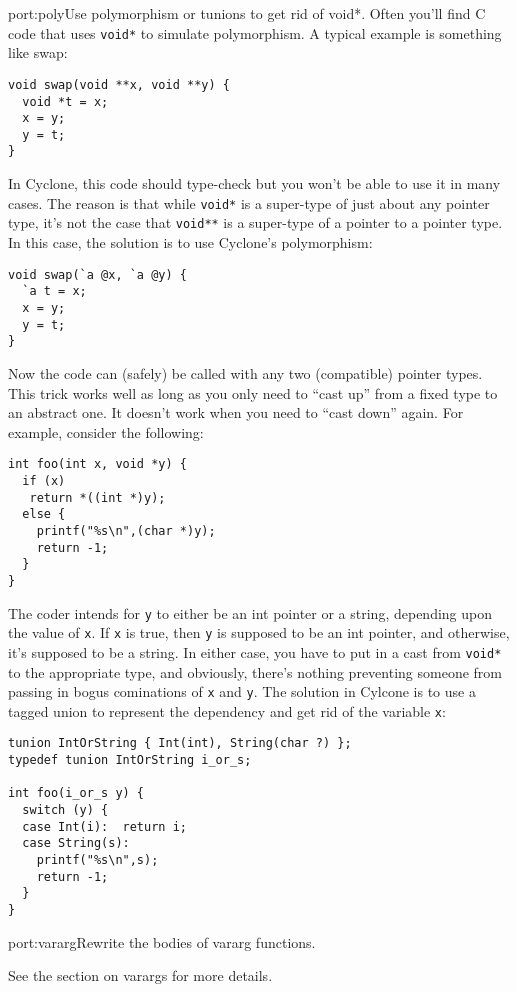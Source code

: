 \begin{porta}{port:poly}{Use polymorphism or tunions to get rid of void*.}  
Often you'll find C code that uses \texttt{void*} to simulate
polymorphism.  A typical example is something like swap:
\begin{verbatim}
void swap(void **x, void **y) {
  void *t = x;
  x = y;
  y = t;
}
\end{verbatim}
In Cyclone, this code should type-check but you won't be able
to use it in many cases.  The reason is that while \texttt{void*}
is a super-type of just about any pointer type, it's not the
case that \texttt{void**} is a super-type of a pointer to a
pointer type.  In this case, the solution is to use Cyclone's
polymorphism:
\begin{verbatim}
void swap(`a @x, `a @y) {
  `a t = x;
  x = y;
  y = t;
}
\end{verbatim}
Now the code can (safely) be called with any two (compatible)
pointer types.  This trick works well as long as you only need
to ``cast up'' from a fixed type to an abstract one.  It doesn't
work when you need to ``cast down'' again.  For example, consider
the following:
\begin{verbatim}
int foo(int x, void *y) {
  if (x)
   return *((int *)y);
  else {
    printf("%s\n",(char *)y);
    return -1;
  }
}
\end{verbatim}
The coder intends for \texttt{y} to either be an int pointer or
a string, depending upon the value of \texttt{x}.  If \texttt{x}
is true, then \texttt{y} is supposed to be an int pointer, and
otherwise, it's supposed to be a string.  In either case, you have
to put in a cast from \texttt{void*} to the appropriate type,
and obviously, there's nothing preventing someone from passing
in bogus cominations of \texttt{x} and \texttt{y}.  The solution
in Cylcone is to use a tagged union to represent the dependency
and get rid of the variable \texttt{x}:
\begin{verbatim}
tunion IntOrString { Int(int), String(char ?) };
typedef tunion IntOrString i_or_s;

int foo(i_or_s y) {
  switch (y) {
  case Int(i):  return i;
  case String(s):  
    printf("%s\n",s);
    return -1;
  }
}
\end{verbatim}
\end{porta}

\begin{porta}{port:vararg}{Rewrite the bodies of vararg functions.}

See the section on varargs for more details.  
\end{porta}

